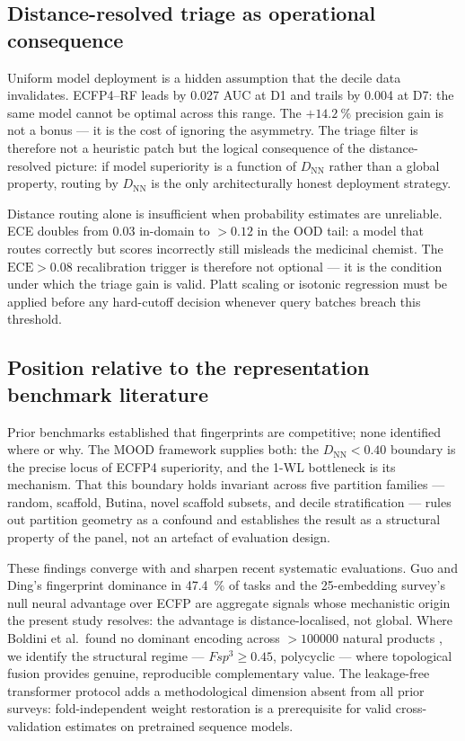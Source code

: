 \subsection{Distance-resolved triage as operational consequence}

Uniform model deployment is a hidden assumption that the decile data invalidates. ECFP4--RF leads by \num{0.027} AUC at D1 and trails by \num{0.004} at D7: the same model cannot be optimal across this range. The $+\qty{14.2}{\percent}$ precision gain is not a bonus --- it is the cost of ignoring the asymmetry. The triage filter is therefore not a heuristic patch but the logical consequence of the distance-resolved picture: if model superiority is a function of $D_{\text{NN}}$ rather than a global property, routing by $D_{\text{NN}}$ is the only architecturally honest deployment strategy.

Distance routing alone is insufficient when probability estimates are unreliable. ECE doubles from \num{0.03} in-domain to $>\num{0.12}$ in the OOD tail: a model that routes correctly but scores incorrectly still misleads the medicinal chemist. The $\mathrm{ECE} > 0.08$ recalibration trigger is therefore not optional --- it is the condition under which the triage gain is valid. Platt scaling or isotonic regression must be applied before any hard-cutoff decision whenever query batches breach this threshold.

\subsection{Position relative to the representation benchmark literature}

Prior benchmarks established that fingerprints are competitive; none identified where or why. The MOOD framework supplies both: the $D_{\text{NN}} < 0.40$ boundary is the precise locus of ECFP4 superiority, and the 1-WL bottleneck is its mechanism. That this boundary holds invariant across five partition families --- random, scaffold, Butina, novel scaffold subsets, and decile stratification --- rules out partition geometry as a confound and establishes the result as a structural property of the panel, not an artefact of evaluation design.

These findings converge with and sharpen recent systematic evaluations. Guo and Ding's fingerprint dominance in \qty{47.4}{\percent} of tasks \citep{guo_ding_2026} and the 25-embedding survey's null neural advantage over ECFP \citep{benchmark_pretrained_2025} are aggregate signals whose mechanistic origin the present study resolves: the advantage is distance-localised, not global. Where Boldini et al.\ found no dominant encoding across $>\num{100000}$ natural products \citep{boldini2024}, we identify the structural regime --- $Fsp^3 \ge 0.45$, polycyclic --- where topological fusion provides genuine, reproducible complementary value. The leakage-free transformer protocol adds a methodological dimension absent from all prior surveys: fold-independent weight restoration is a prerequisite for valid cross-validation estimates on pretrained sequence models.

